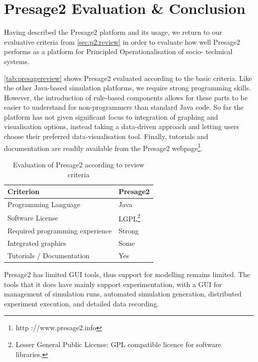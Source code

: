\section{Presage2 Evaluation \& Conclusion}

Having described the Presage2 platform and its usage, we return to our
evaluative criteria from \autoref{sec:p2:review} in order to evaluate how
well Presage2 performs as a platform for Principled Operationalisation of socio-
technical systems.

\autoref{tab:presagereview} shows Presage2 evaluated according to the basic
criteria. Like the other Java-based simulation platforms, we require strong
programming skills. However, the introduction of rule-based components allows
for these parts to be easier to understand for non-programmers than standard
Java code. So far the platform has not given significant focus to integration of
graphing and visualisation options, instead taking a data-driven approach and
letting users choose their preferred data-visualisation tool. Finally, tutorials
and documentation are readily available from the Presage2 webpage\footnote{http
://www.presage2.info}.

\begin{table}[h]
\begin{minipage}{1\textwidth}
	\myfloatalign
	\caption{Evaluation of Presage2 according to review criteria}\label{tab:presagereview}
	\begin{tabularx}{\textwidth}{X|X}
	Criterion & Presage2 \\ \midrule
	Programming Language & Java \\
	Software License & LGPL\footnote{Lesser General Public License: \ac{GPL}
	compatible licence for software libraries.} \\
	Required programming experience & Strong \\
	Integrated graphics & Some \\
	Tutorials / Documentation & Yes \\
	\end{tabularx}
\end{minipage}
\end{table}

Presage2 has limited \ac{GUI} tools, thus support for modelling remains limited.
The tools that it does have mainly support experimentation, with a \ac{GUI} for
management of simulation runs, automated simulation generation, distributed
experiment execution, and detailed data recording.

